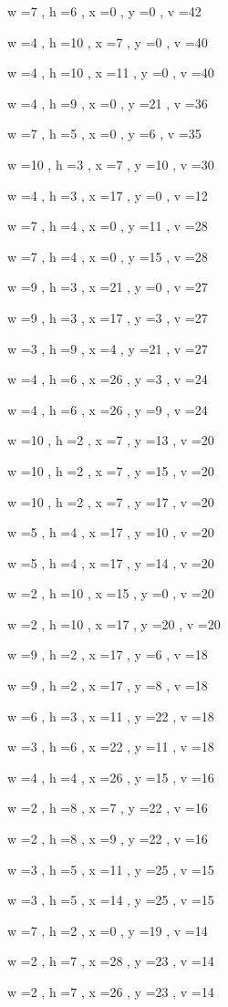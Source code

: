 \documentclass[11pt]{article}
\begin{document}
w =7 , h =6 , x =0 , y =0 , v =42
\par
w =4 , h =10 , x =7 , y =0 , v =40
\par
w =4 , h =10 , x =11 , y =0 , v =40
\par
w =4 , h =9 , x =0 , y =21 , v =36
\par
w =7 , h =5 , x =0 , y =6 , v =35
\par
w =10 , h =3 , x =7 , y =10 , v =30
\par
w =4 , h =3 , x =17 , y =0 , v =12
\par
w =7 , h =4 , x =0 , y =11 , v =28
\par
w =7 , h =4 , x =0 , y =15 , v =28
\par
w =9 , h =3 , x =21 , y =0 , v =27
\par
w =9 , h =3 , x =17 , y =3 , v =27
\par
w =3 , h =9 , x =4 , y =21 , v =27
\par
w =4 , h =6 , x =26 , y =3 , v =24
\par
w =4 , h =6 , x =26 , y =9 , v =24
\par
w =10 , h =2 , x =7 , y =13 , v =20
\par
w =10 , h =2 , x =7 , y =15 , v =20
\par
w =10 , h =2 , x =7 , y =17 , v =20
\par
w =5 , h =4 , x =17 , y =10 , v =20
\par
w =5 , h =4 , x =17 , y =14 , v =20
\par
w =2 , h =10 , x =15 , y =0 , v =20
\par
w =2 , h =10 , x =17 , y =20 , v =20
\par
w =9 , h =2 , x =17 , y =6 , v =18
\par
w =9 , h =2 , x =17 , y =8 , v =18
\par
w =6 , h =3 , x =11 , y =22 , v =18
\par
w =3 , h =6 , x =22 , y =11 , v =18
\par
w =4 , h =4 , x =26 , y =15 , v =16
\par
w =2 , h =8 , x =7 , y =22 , v =16
\par
w =2 , h =8 , x =9 , y =22 , v =16
\par
w =3 , h =5 , x =11 , y =25 , v =15
\par
w =3 , h =5 , x =14 , y =25 , v =15
\par
w =7 , h =2 , x =0 , y =19 , v =14
\par
w =2 , h =7 , x =28 , y =23 , v =14
\par
w =2 , h =7 , x =26 , y =23 , v =14
\end{document}
